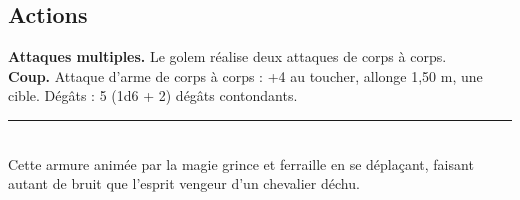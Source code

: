 \begin{figure*}[hb!]
{\begin{minipage}[c]{.45\linewidth}
    \subsection*{Actions}
    {\bfseries Attaques multiples.} Le golem réalise deux attaques de corps à corps.\\
    {\bfseries Coup.} Attaque d'arme de corps à corps : +4 au toucher, allonge 1,50 m, une cible. Dégâts : 5 (1d6 + 2) dégâts contondants.\\
    \noindent\rule{\textwidth}{1pt} \\
    Cette armure animée par la magie grince et ferraille en se déplaçant, faisant autant de bruit que l'esprit vengeur d'un chevalier déchu.
  \end{minipage}
}%
\end{figure*}

